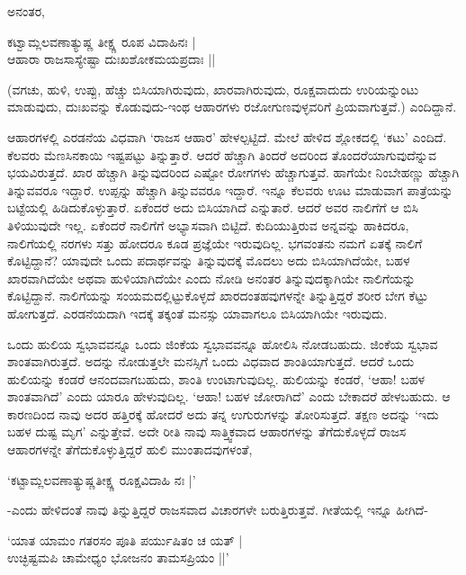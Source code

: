 ಅನಂತರ,

\begin{shloka}
ಕಟ್ವಾಮ್ಲಲವಣಾತ್ಯುಷ್ಣ ತೀಕ್ಷ್ಣ ರೂಪ ವಿದಾಹಿನಃ |\\
ಆಹಾರಾ ರಾಜಸಾಸ್ಯೇಷ್ಟಾ ದುಃಖಶೋಕಮಯಪ್ರದಾಃ ||
\end{shloka}

(ವಗಚು, ಹುಳಿ, ಉಪ್ಪು, ಹೆಚ್ಚು ಬಿಸಿಯಾಗಿರುವುದು, ಖಾರವಾಗಿರುವುದು, ರೂಕ್ಷವಾದುದು ಉರಿಯನ್ನುಂಟು ಮಾಡುವುದು, ದುಃಖವನ್ನು ಕೊಡುವುದು-ಇಂಥ ಆಹಾರಗಳು ರಜೋಗುಣವುಳ್ಳವರಿಗೆ ಪ್ರಿಯವಾಗುತ್ತವೆ.) ಎಂದಿದ್ದಾನೆ.

ಆಹಾರಗಳಲ್ಲಿ ಎರಡನೆಯ ವಿಧವಾಗಿ `ರಾಜಸ ಆಹಾರ' ಹೇಳಲ್ಪಟ್ಟಿದೆ. ಮೇಲೆ ಹೇಳಿದ ಶ್ಲೋಕದಲ್ಲಿ `ಕಟು' ಎಂದಿದೆ. ಕೆಲವರು ಮೆಣಸಿನಕಾಯಿ ಇಷ್ಟಪಟ್ಟು ತಿನ್ನುತ್ತಾರೆ. ಆದರೆ ಹೆಚ್ಚಾಗಿ ತಿಂದರೆ ಅದರಿಂದ ತೊಂದರೆಯಾಗುವುದೆನ್ನುವ ಭಯವಿರುತ್ತದೆ. ಖಾರ ಹೆಚ್ಚಾಗಿ ತಿನ್ನುವುದರಿಂದ ಎಷ್ಟೋ ರೋಗಗಳು ಹೆಚ್ಚಾಗುತ್ತವೆ. ಹಾಗೆಯೇ ನಿಂಬೇಹಣ್ಣು ಹೆಚ್ಚಾಗಿ ತಿನ್ನುವವರೂ ಇದ್ದಾರೆ. ಉಪ್ಪನ್ನು ಹೆಚ್ಚಾಗಿ ತಿನ್ನುವವರೂ ಇದ್ದಾರೆ. ಇನ್ನೂ ಕೆಲವರು ಊಟ ಮಾಡುವಾಗ ಪಾತ್ರೆಯನ್ನು ಬಟ್ಟೆಯಲ್ಲಿ ಹಿಡಿದುಕೊಳ್ಳುತ್ತಾರೆ. ಏಕೆಂದರೆ ಅದು ಬಿಸಿಯಾಗಿದೆ ಎನ್ನುತಾರೆ. ಆದರೆ ಅವರ ನಾಲಿಗೆಗೆ ಆ ಬಿಸಿ ತಿಳಿಯುವುದೇ ಇಲ್ಲ. ಏಕೆಂದರೆ ನಾಲಿಗೆಗೆ ಅಭ್ಯಾಸವಾಗಿ ಬಿಟ್ಟಿದೆ. ಕುದಿಯುತ್ತಿರುವ ಅನ್ನವನ್ನು ಹಾಕಿದರೂ, ನಾಲಿಗೆಯಲ್ಲಿ ನರಗಳು ಸತ್ತು ಹೋದರೂ ಕೂಡ ಪ್ರಜ್ಞೆಯೇ ಇರುವುದಿಲ್ಲ. ಭಗವಂತನು ನಮಗೆ ಏತಕ್ಕೆ ನಾಲಿಗೆ ಕೊಟ್ಟಿದ್ದಾನೆ? ಯಾವುದೇ ಒಂದು ಪದಾರ್ಥವನ್ನು ತಿನ್ನುವುದಕ್ಕೆ ಮೊದಲು ಅದು ಬಿಸಿಯಾಗಿದೆಯೇ, ಬಹಳ ಖಾರವಾಗಿದೆಯೇ ಅಥವಾ ಹುಳಿಯಾಗಿದೆಯೇ ಎಂದು ನೋಡಿ ಅನಂತರ ತಿನ್ನುವುದಕ್ಕಾಗಿಯೇ ನಾಲಿಗೆಯನ್ನು ಕೊಟ್ಟಿದ್ದಾನೆ. ನಾಲಿಗೆಯನ್ನು ಸಂಯಮದಲ್ಲಿಟ್ಟುಕೊಳ್ಳದೆ ಖಾರದಂತಹವುಗಳನ್ನೇ ತಿನ್ನುತ್ತಿದ್ದರೆ ಶರೀರ ಬೇಗ ಕೆಟ್ಟು ಹೋಗುತ್ತದೆ. ಎರಡನೆಯದಾಗಿ ಇದಕ್ಕೆ ತಕ್ಕಂತೆ ಮನಸ್ಸು ಯಾವಾಗಲೂ ಬಿಸಿಯಾಗಿಯೇ ಇರುವುದು.

ಒಂದು ಹುಲಿಯ ಸ್ವಭಾವವನ್ನೂ ಒಂದು ಜಿಂಕೆಯ ಸ್ವಭಾವವನ್ನೂ ಹೋಲಿಸಿ ನೋಡಬಹುದು. ಜಿಂಕೆಯ ಸ್ವಭಾವ ಶಾಂತವಾಗಿರುತ್ತದೆ. ಅದನ್ನು ನೋಡುತ್ತಲೇ ಮನಸ್ಸಿಗೆ ಒಂದು ವಿಧವಾದ ಶಾಂತಿಯಾಗುತ್ತದೆ. ಆದರೆ ಒಂದು ಹುಲಿಯನ್ನು ಕಂಡರೆ ಆನಂದವಾಗಬಹುದು, ಶಾಂತಿ ಉಂಟಾಗುವುದಿಲ್ಲ. ಹುಲಿಯನ್ನು ಕಂಡರೆ, `ಆಹಾ! ಬಹಳ ಶಾಂತವಾಗಿದೆ' ಎಂದು ಯಾರೂ ಹೇಳುವುದಿಲ್ಲ. `ಆಹಾ! ಬಹಳ ಜೋರಾಗಿದೆ' ಎಂದು ಬೇಕಾದರೆ ಹೇಳಬಹುದು. ಆ ಕಾರಣದಿಂದ ನಾವು ಅದರ ಹತ್ತಿರಕ್ಕೆ ಹೋದರೆ ಅದು ತನ್ನ ಉಗುರುಗಳನ್ನು ತೋರಿಸುತ್ತದೆ. ತಕ್ಷಣ ಅದನ್ನು `ಇದು ಬಹಳ ದುಷ್ಟ ಮೃಗ' ಎನ್ನುತ್ತೇವೆ. ಅದೇ ರೀತಿ ನಾವು ಸಾತ್ತ್ವಿಕವಾದ ಆಹಾರಗಳನ್ನು ತೆಗೆದುಕೊಳ್ಳದೆ ರಾಜಸ ಆಹಾರಗಳನ್ನೇ ತೆಗೆದುಕೊಳ್ಳುತ್ತಿದ್ದರೆ ಹುಲಿ ಮುಂತಾದವುಗಳಂತೆ,


\begin{shloka}
`ಕಟ್ಟಾಮ್ಲಲವಣಾತ್ಯುಷ್ಣತೀಕ್ಷ್ಣ ರೂಕ್ಷವಿದಾಹಿ ನಃ |'
\end{shloka}

-ಎಂದು ಹೇಳಿದಂತೆ ನಾವು ತಿನ್ನುತ್ತಿದ್ದರೆ ರಾಜಸವಾದ ವಿಚಾರಗಳೇ ಬರುತ್ತಿರುತ್ತವೆ. ಗೀತೆಯಲ್ಲಿ ಇನ್ನೂ ಹೀಗಿದೆ-

\begin{shloka}
`ಯಾತ ಯಾಮಂ ಗತರಸಂ ಪೂತಿ ಪರ್ಯುಷಿತಂ ಚ ಯತ್ |\\
ಉಚ್ಛಿಷ್ಟಮಪಿ ಚಾಮೇಧ್ಯಂ ಭೋಜನಂ ತಾಮಸಪ್ರಿಯಂ ||'
\end{shloka}

